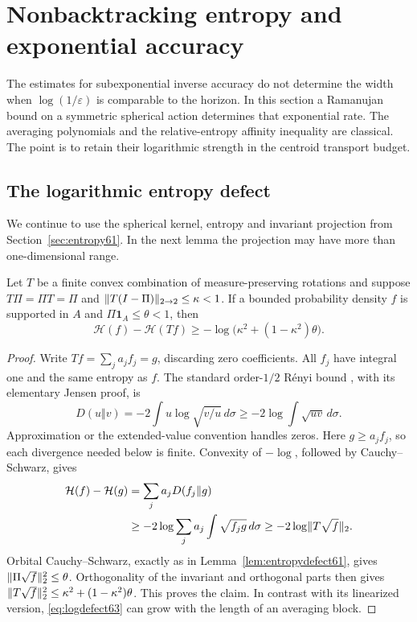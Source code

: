 \section{Nonbacktracking entropy and exponential accuracy}\label{sec:exponential63}
The estimates for subexponential inverse accuracy do not determine the
width when $\log(1/\varepsilon)$ is comparable to the horizon. In this
section a Ramanujan bound on a symmetric spherical action determines
that exponential rate. The averaging polynomials and the
relative-entropy affinity inequality are classical. The point is to
retain their logarithmic strength in the centroid transport budget.

\subsection{The logarithmic entropy defect}
We continue to use the spherical kernel, entropy and invariant
projection from Section~\ref{sec:entropy61}. In the next lemma the
projection may have more than one-dimensional range.
\begin{lemma}\label{lem:logdefect63}
Let $T$ be a finite convex combination of measure-preserving rotations
and suppose $T\Pi=\Pi T=\Pi$ and
$\lVert T(I-\Pi)\rVert_{2\to2}\le\kappa<1$.
If a bounded probability density $f$ is supported in $A$ and
$\Pi\mathbf1_A\le\theta<1$, then
\begin{equation}\label{eq:logdefect63}
 \mathcal H(f)-\mathcal H(Tf)
 \ge-\log\bigl(\kappa^2+(1-\kappa^2)\theta\bigr).
\end{equation}
\end{lemma}
\begin{proof}
Write $Tf=\sum_j a_j f_j=g$, discarding zero coefficients.
All $f_j$ have integral one and the same entropy as $f$.
The standard order-$1/2$ R\'enyi bound
\cite[Theorem~3]{vEH63}, with its elementary Jensen proof, is
\[
 D(u\Vert v)=-2\int u\log\sqrt{v/u}\,d\sigma
       \ge-2\log\int\sqrt{uv}\,d\sigma.
\]
Approximation or the extended-value convention handles zeros. Here
$g\ge a_j f_j$, so each divergence needed below is finite. Convexity
of $-\log$, followed by Cauchy--Schwarz, gives
\begin{align*}
 \mathcal H(f)-\mathcal H(g)
 &=\sum_j a_jD(f_j\Vert g)\\
 &\ge-2\log\sum_j a_j\int\sqrt{f_jg}\,d\sigma
 \ge-2\log\lVert T\sqrt f\rVert_2.
\end{align*}
Orbital Cauchy--Schwarz, exactly as in
Lemma~\ref{lem:entropydefect61}, gives
$\lVert \Pi\sqrt f\rVert_2^2\le\theta$. Orthogonality of the invariant
and orthogonal parts then gives
$\lVert T\sqrt f\rVert_2^2\le\kappa^2+(1-\kappa^2)\theta$.
This proves the claim. In contrast with its linearized version,
\eqref{eq:logdefect63} can grow with the length of an averaging block.
\end{proof}

